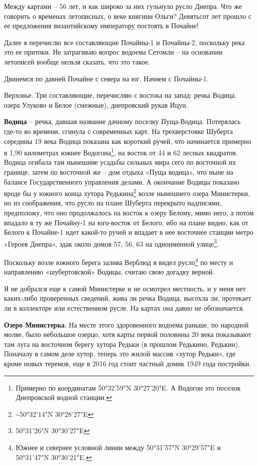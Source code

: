 Между картами – 56 лет, и как широко за них гульнуло русло Днепра. Что же говорить о временах летописных, о веке княгини Ольги? Девятьсот лет прошло с ее предложения византийскому императору постоять в Почайне!

Далее я перечислю все составляющие Почайны-1 и Почайны-2, поскольку река это ее притоки. Не затрагиваю вопрос водоема Сетомли – на основании летописей вообще нельзя сказать, что это такое.

Двинемся по давней Почайне с севера на юг. Начнем с Почайны-1.

Верховье. Три составляющие, перечисляю с востока на запад: речка Водица, озера Улуково и Белое (смежные), днепровский рукав Ицун.

\textbf{Водица} – речка, давшая название дачному поселку Пуща-Водица. Потерялась где-то во времени, сгинула с современных карт. На трехверстовке Шуберта середины 19 века Водица показана как короткий ручей, что начинается примерно в 1,90 километрах южнее Водогона\footnote{Примерно по координатам 50°32'59"N 30°27'20"E. А Водогон это поселок Днепровской водной станции.}, на восток от 44 и 62 лесных квадратов. Водица огибала там нынешние усадьбы сильных мира сего по восточной их границе, затем по восточной же – дом отдыха «Пуща водица», что ныне на балансе Государственного управления делами. А окончание Водицы показано вроде бы у южного конца хутора Редькина\footnote{\textasciitilde{}50°32'14"N 30°28'27"E} возле нынешнего озера Министерки, но из соображения, что русло на плане Шуберта перекрыто надписями, предположу, что оно продолжалось на восток к озеру Белому, мимо него, а потом впадало в ту же Почайну-1 на юго-восток от Белого, ибо на плане видно, как от Белого к Почайне-1 идет какой-то ручей и впадает в нее восточнее станции метро «Героев Днепра», эдак около домов 57, 56, 63 на одноименной улице\footnote{50°31'26"N 30°30'27"E}.

Поскольку возле южного берега залива Верблюд я видел русло\footnote{Южнее и севернее условной линии между 50°31'57"N 30°29'57"E и 50°31'47"N  30°30'21"E.} по месту и направлению «шубертовской» Водицы, считаю свою догадку верной.

Я не добрался еще к самой Министерке и не осмотрел местность, и у меня нет каких-либо проверенных сведений, жива ли речка Водица, высохла ли, протекает ли в коллекторе или естественном русле. На картах она давно не обозначается.

\textbf{Озеро Министерка}. На месте этого здоровенного водоема раньше, по народной молве, было небольшое озерцо, хотя карты первой половины 20 века показывают там луга на восточном берегу хутора Редьки (в прошлом Редькино, Редькин). Поначалу в самом деле хутор, теперь это жилой массив «хутор Редьки», где кроме новых теремов, еще в 2016 год стоит частный домик 1949 года постройки. 

